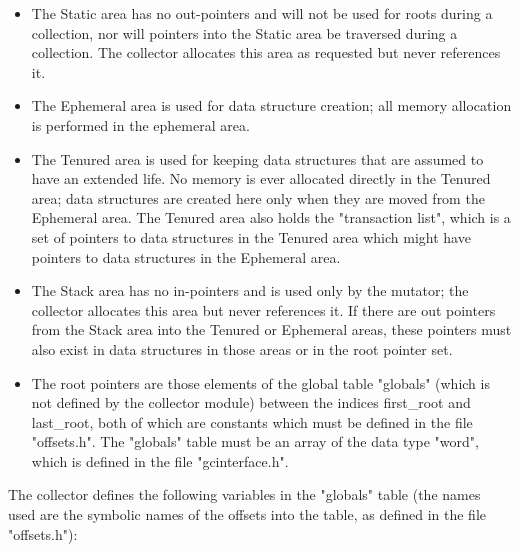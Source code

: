 \begin{itemize}
\item
The Static area has no out-pointers and will not be used for roots
during a collection, nor will pointers into the Static area be traversed
during a collection. The collector allocates this area as requested
but never references it.

\item
The Ephemeral area is used for data structure creation; all memory 
allocation is performed in the ephemeral area.

\item
The Tenured area is used for keeping data structures that are assumed
to have an extended life. No memory is ever allocated directly in
the Tenured area; data structures are created here only when they are
moved from the Ephemeral area. The Tenured area also holds the 
"transaction list", which is a set of pointers to data structures in 
the Tenured area which might have pointers to data structures in the
Ephemeral area.

\item
The Stack area has no in-pointers and is used only by the mutator; the
collector allocates this area but never references it. If there are
out pointers from the Stack area into the Tenured or Ephemeral areas,
these pointers must also exist in data structures in those areas or
in the root pointer set.

\item
The root pointers are those elements of the global table "globals"
(which is not defined by the collector module) between the indices
{\sc first\_root} and {\sc last\_root}, both of which are constants
which must be defined in the file "offsets.h". The "globals" table
must be an array of the data type "word", which is defined in the file
"gcinterface.h".

\end{itemize}

The collector defines the following variables in the "globals" table
(the names used are the symbolic names of the offsets into the table,
as defined in the file "offsets.h"):

